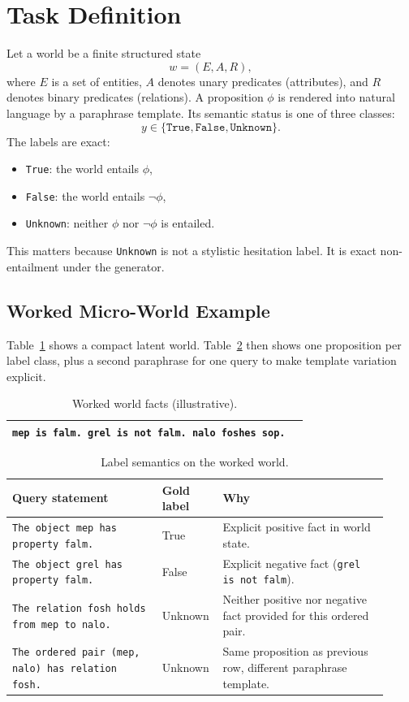 \documentclass[11pt]{article}
\begin{document}
\section{Task Definition}
Let a world be a finite structured state
\[
w = (E, A, R),
\]
where \(E\) is a set of entities, \(A\) denotes unary predicates (attributes), and \(R\) denotes binary predicates (relations).
A proposition \(\phi\) is rendered into natural language by a paraphrase template.
Its semantic status is one of three classes:
\[
y \in \{\texttt{True},\texttt{False},\texttt{Unknown}\}.
\]
The labels are exact:
\begin{itemize}
  \item \texttt{True}: the world entails \(\phi\),
  \item \texttt{False}: the world entails \(\neg \phi\),
  \item \texttt{Unknown}: neither \(\phi\) nor \(\neg \phi\) is entailed.
\end{itemize}

This matters because \texttt{Unknown} is not a stylistic hesitation label.
It is exact non-entailment under the generator.

\subsection{Worked Micro-World Example}
Table~\ref{tab:world_facts} shows a compact latent world.
Table~\ref{tab:world_queries} then shows one proposition per label class, plus a second paraphrase for one query to make template variation explicit.

\begin{table}[H]
\centering
\caption{Worked world facts (illustrative).}
\label{tab:world_facts}
\begin{tabular}{p{0.96\linewidth}}
\toprule
\texttt{mep is falm. grel is not falm. nalo foshes sop.} \\
\bottomrule
\end{tabular}
\end{table}

\begin{table}[H]
\centering
\caption{Label semantics on the worked world.}
\label{tab:world_queries}
\begin{tabular}{p{0.38\linewidth} p{0.12\linewidth} p{0.42\linewidth}}
\toprule
Query statement & Gold label & Why \\
\midrule
\texttt{The object mep has property falm.} & True & Explicit positive fact in world state. \\
\addlinespace
\texttt{The object grel has property falm.} & False & Explicit negative fact (\texttt{grel is not falm}). \\
\addlinespace
\texttt{The relation fosh holds from mep to nalo.} & Unknown & Neither positive nor negative fact provided for this ordered pair. \\
\addlinespace
\texttt{The ordered pair (mep, nalo) has relation fosh.} & Unknown & Same proposition as previous row, different paraphrase template. \\
\bottomrule
\end{tabular}
\end{table}
\end{document}
